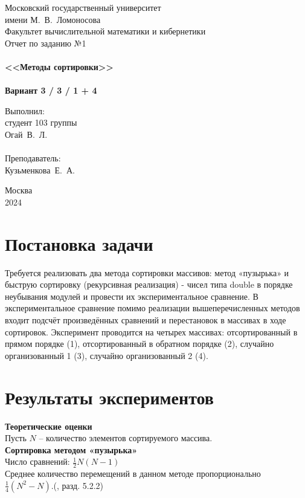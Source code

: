 \documentclass[a4paper,12pt,titlepage,final]{article}
\newcommand{\university}{Московский государственный университет \\имени М.~В.~Ломоносова\\
	Факультет вычислительной математики и кибернетики}
\begin{document}
\begin{titlepage}
    \begin{center}
	{\large \sc \university\\}
	\vfill
	{\Large \sc Отчет по заданию №1}\\
	~\\
	{\large \bf <<Методы сортировки>>}\\ 
	~\\
	{\large \bf Вариант 3 / 3 / 1 + 4}
    \end{center}
    \begin{flushright}
	\vfill {Выполнил:\\
	студент 103 группы\\
	Огай~В.~Л.\\
	~\\
	Преподаватель:\\
	Кузьменкова~Е.~А.}
    \end{flushright}
    \begin{center}
	\vfill
	{\small Москва\\2024}
    \end{center}
\end{titlepage}

\tableofcontents

\newpage
\section{Постановка задачи}
Требуется реализовать два метода сортировки массивов: метод «пузырька» и быструю сортировку (рекурсивная реализация) - чисел типа double в порядке неубывания модулей и провести их экспериментальное сравнение. В экспериментальное сравнение помимо реализации вышеперечисленных методов входит подсчёт произведённых сравнений и перестановок в массивах в ходе сортировок. Эксперимент проводится на четырех массивах: отсортированный в прямом порядке (1), отсортированный в обратном порядке (2), случайно организованный 1 (3), случайно организованный 2 (4).

\newpage
\section{Результаты экспериментов}
\textbf{\vspace{0.2cm} \hspace{-0.92cm} \large Теоретические оценки\\}
\vspace{0.2cm}
Пусть $N$ -- количество элементов сортируемого массива.\\
\vspace{0.2cm}
\textbf{Сортировка методом «пузырька»} \\
\vspace{0.15cm}
\hspace{-0.32cm} Число сравнений: $\frac{1}{2}N(N - 1)$\\
Среднее количество перемещений в данном методе пропорционально $\frac{1}{4}(N^2 - N)$.(\cite{first}, разд. 5.2.2)
\end{document}
